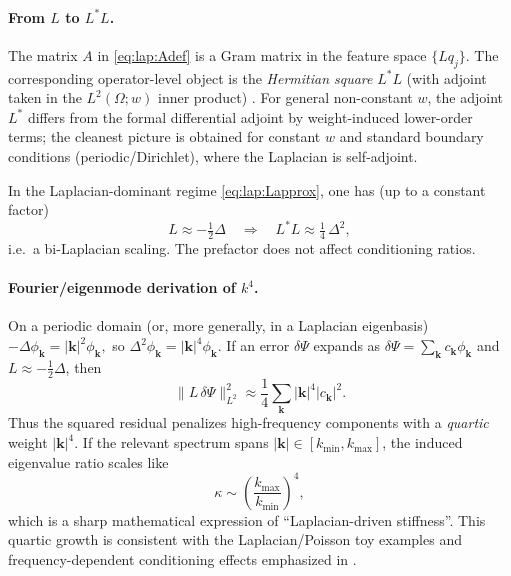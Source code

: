 \paragraph{From \(L\) to \(L^\ast L\).}
The matrix $A$ in \eqref{eq:lap:Adef} is a Gram matrix in the feature space
$\{Lq_j\}$.
The corresponding operator-level object is the \emph{Hermitian square}
$L^\ast L$ (with adjoint taken in the $L^2(\Omega;w)$ inner product)
\cite{De_Ryck_2024}. For general non-constant $w$, the adjoint $L^\ast$ differs from the
formal differential adjoint by weight-induced lower-order terms; the cleanest picture
is obtained for constant $w$ and standard boundary conditions (periodic/Dirichlet),
where the Laplacian is self-adjoint.

In the Laplacian-dominant regime \eqref{eq:lap:Lapprox}, one has (up to a constant factor)
\begin{equation}
L \approx -\tfrac12\Delta
\quad\Rightarrow\quad
L^\ast L \approx \tfrac14\,\Delta^2,
\label{eq:lap:bilap}
\end{equation}
i.e.\ a bi-Laplacian scaling. The prefactor does not affect conditioning ratios.

\paragraph{Fourier/eigenmode derivation of \(k^4\).}
On a periodic domain (or, more generally, in a Laplacian eigenbasis)
\(
-\Delta \phi_{\mathbf k} = |\mathbf k|^2\phi_{\mathbf k},
\)
so
\(
\Delta^2\phi_{\mathbf k} = |\mathbf k|^4\phi_{\mathbf k}.
\)
If an error $\delta\Psi$ expands as $\delta\Psi=\sum_{\mathbf k}c_{\mathbf k}\phi_{\mathbf k}$
and $L\approx -\tfrac12\Delta$, then
\begin{equation}
\|L\,\delta\Psi\|_{L^2}^2
\approx
\frac14\sum_{\mathbf k} |\mathbf k|^4|c_{\mathbf k}|^2.
\label{eq:lap:k4}
\end{equation}
Thus the squared residual penalizes high-frequency components with a \emph{quartic}
weight $|\mathbf k|^4$.
If the relevant spectrum spans $|\mathbf k|\in[k_{\min},k_{\max}]$, the induced
eigenvalue ratio scales like
\begin{equation}
\kappa \sim \left(\frac{k_{\max}}{k_{\min}}\right)^4,
\label{eq:lap:kappa}
\end{equation}
which is a sharp mathematical expression of ``Laplacian-driven stiffness''.
This quartic growth is consistent with the Laplacian/Poisson toy examples and
frequency-dependent conditioning effects emphasized in \cite{De_Ryck_2024}.

